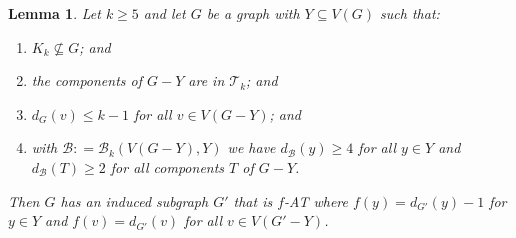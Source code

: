 \documentclass[12pt]{article}
\theoremstyle{plain}
\newtheorem{lem}[thm]{Lemma}
\theoremstyle{definition}
\theoremstyle{remark}
\newcommand{\fancy}[1]{\mathcal{#1}}
\newcommand{\T}{\fancy{T}}
\newcommand{\B}{\fancy{B}}
\newcommand{\DefinedAs}{\mathrel{\mathop:}=}
\begin{document}
\begin{lem}
	\label{MultipleHighConfigurationEulerLopsided} Let $k \ge 5$ and let $G$ be a graph with
	$Y\subseteq V(G)$ such that: 
	\begin{enumerate}
		\item $K_{k}\not\subseteq G$; and 
		\item the components of $G-Y$ are in $\T_{k}$; and 
		\item $d_{G}(v)\leq k-1$ for all $v\in V(G-Y)$; and 
		\item with $\B \DefinedAs \B_k(V(G-Y), Y)$ we have $d_{\B}(y) \ge 4$ for all $y \in Y$ and $d_{\B}(T) \ge 2$ for all components $T$ of $G-Y$.
	\end{enumerate}
	\noindent Then $G$ has an induced subgraph $G'$ that is $f$-AT where $f(y)=d_{G'}(y)-1$
	for $y\in Y$ and $f(v)=d_{G'}(v)$ for all $v\in V(G'-Y)$.\end{lem}





\end{document}
